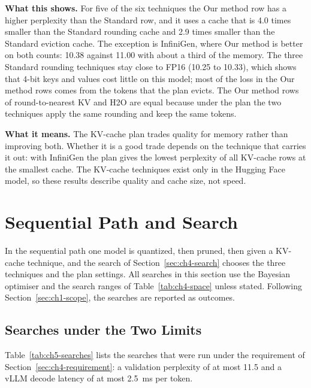 \textbf{What this shows.} For five of the six techniques the Our method row has a higher perplexity than the Standard row, and it uses a cache that is 4.0 times smaller than the Standard rounding cache and 2.9 times smaller than the Standard eviction cache. The exception is InfiniGen, where Our method is better on both counts: 10.38 against 11.00 with about a third of the memory. The three Standard rounding techniques stay close to FP16 (10.25 to 10.33), which shows that 4-bit keys and values cost little on this model; most of the loss in the Our method rows comes from the tokens that the plan evicts. The Our method rows of round-to-nearest KV and H2O are equal because under the plan the two techniques apply the same rounding and keep the same tokens.

\textbf{What it means.} The KV-cache plan trades quality for memory rather than improving both. Whether it is a good trade depends on the technique that carries it out: with InfiniGen the plan gives the lowest perplexity of all KV-cache rows at the smallest cache. The KV-cache techniques exist only in the Hugging Face model, so these results describe quality and cache size, not speed.

\section{Sequential Path and Search}
\label{sec:ch5-search}

In the sequential path one model is quantized, then pruned, then given a KV-cache technique, and the search of Section~\ref{sec:ch4-search} chooses the three techniques and the plan settings. All searches in this section use the Bayesian optimiser and the search ranges of Table~\ref{tab:ch4-space} unless stated. Following Section~\ref{sec:ch1-scope}, the searches are reported as outcomes.

\subsection{Searches under the Two Limits}

Table~\ref{tab:ch5-searches} lists the searches that were run under the requirement of Section~\ref{sec:ch4-requirement}: a validation perplexity of at most 11.5 and a vLLM decode latency of at most 2.5~ms per token.

